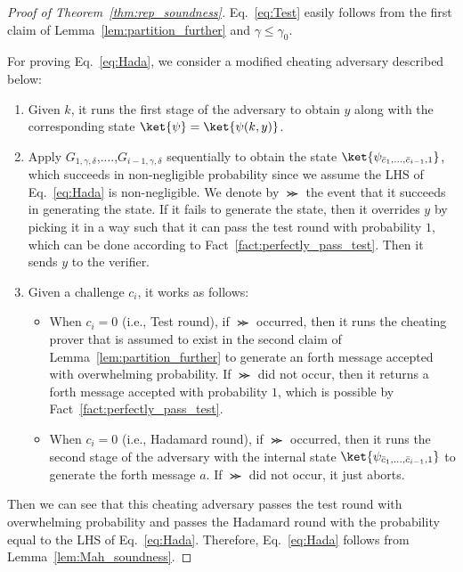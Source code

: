\begin{proof}[Proof of Theorem~\ref{thm:rep_soundness}]
Eq.~\ref{eq:Test} easily follows from the first claim of Lemma~\ref{lem:partition_further} and $\gamma\leq \gamma_0$.

For proving Eq.~\ref{eq:Hada}, we consider a modified cheating adversary described below:

\begin{enumerate}
    \item Given $k$, it runs the first stage of the adversary to obtain $y$ along with the corresponding state $\ket{\psi}=\ket{\psi(k,y)}$.
    \item Apply $G_{1,\gamma,\delta}$,....,$G_{i-1,\gamma,\delta}$ sequentially to obtain the state $\ket{\psi_{\bar{c}_1,\dots,\bar{c}_{i-1},1}}$, which succeeds in non-negligible probability since we assume the LHS of Eq.~\ref{eq:Hada} is non-negligible. 
    We denote by $\Succ$ the event that it succeeds in generating the state.
    If it fails to generate the state, then it overrides $y$ by picking it in a way such that it can pass the test round with probability $1$, which can be done according to Fact~\ref{fact:perfectly_pass_test}.
    Then it sends $y$ to the verifier.
    \item Given a challenge $c_i$, it works as follows:
    \begin{itemize}
     \item When $c_i=0$ (i.e., Test round), if $\Succ$ occurred, then it runs the cheating prover that is assumed to exist in the second claim of Lemma~\ref{lem:partition_further} to generate an forth message accepted with overwhelming probability. 
     If $\Succ$ did not occur, then it returns a forth message accepted with probability $1$, which is possible by Fact~\ref{fact:perfectly_pass_test}.
    \item When $c_i=0$ (i.e., Hadamard round), if $\Succ$ occurred, then it runs the second stage of the adversary with the internal state  $\ket{\psi_{\bar{c}_1,\dots,\bar{c}_{i-1},1}}$ to generate the forth message $a$. If $\Succ$ did not occur, it just aborts.
    \end{itemize}
\end{enumerate}
Then we can see that this cheating adversary passes the test round with overwhelming probability and passes the Hadamard round with the probability equal to the LHS of Eq.~\ref{eq:Hada}.
Therefore, Eq.~\ref{eq:Hada} follows from Lemma~\ref{lem:Mah_soundness}.


\end{proof}

